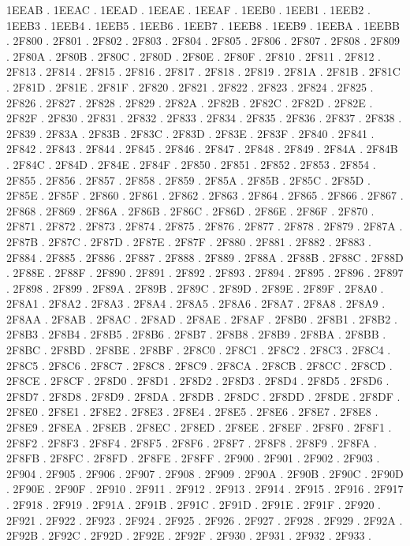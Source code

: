 1EEAB .
1EEAC .
1EEAD .
1EEAE .
1EEAF .
1EEB0 .
1EEB1 .
1EEB2 .
1EEB3 .
1EEB4 .
1EEB5 .
1EEB6 .
1EEB7 .
1EEB8 .
1EEB9 .
1EEBA .
1EEBB .
2F800 .
2F801 .
2F802 .
2F803 .
2F804 .
2F805 .
2F806 .
2F807 .
2F808 .
2F809 .
2F80A .
2F80B .
2F80C .
2F80D .
2F80E .
2F80F .
2F810 .
2F811 .
2F812 .
2F813 .
2F814 .
2F815 .
2F816 .
2F817 .
2F818 .
2F819 .
2F81A .
2F81B .
2F81C .
2F81D .
2F81E .
2F81F .
2F820 .
2F821 .
2F822 .
2F823 .
2F824 .
2F825 .
2F826 .
2F827 .
2F828 .
2F829 .
2F82A .
2F82B .
2F82C .
2F82D .
2F82E .
2F82F .
2F830 .
2F831 .
2F832 .
2F833 .
2F834 .
2F835 .
2F836 .
2F837 .
2F838 .
2F839 .
2F83A .
2F83B .
2F83C .
2F83D .
2F83E .
2F83F .
2F840 .
2F841 .
2F842 .
2F843 .
2F844 .
2F845 .
2F846 .
2F847 .
2F848 .
2F849 .
2F84A .
2F84B .
2F84C .
2F84D .
2F84E .
2F84F .
2F850 .
2F851 .
2F852 .
2F853 .
2F854 .
2F855 .
2F856 .
2F857 .
2F858 .
2F859 .
2F85A .
2F85B .
2F85C .
2F85D .
2F85E .
2F85F .
2F860 .
2F861 .
2F862 .
2F863 .
2F864 .
2F865 .
2F866 .
2F867 .
2F868 .
2F869 .
2F86A .
2F86B .
2F86C .
2F86D .
2F86E .
2F86F .
2F870 .
2F871 .
2F872 .
2F873 .
2F874 .
2F875 .
2F876 .
2F877 .
2F878 .
2F879 .
2F87A .
2F87B .
2F87C .
2F87D .
2F87E .
2F87F .
2F880 .
2F881 .
2F882 .
2F883 .
2F884 .
2F885 .
2F886 .
2F887 .
2F888 .
2F889 .
2F88A .
2F88B .
2F88C .
2F88D .
2F88E .
2F88F .
2F890 .
2F891 .
2F892 .
2F893 .
2F894 .
2F895 .
2F896 .
2F897 .
2F898 .
2F899 .
2F89A .
2F89B .
2F89C .
2F89D .
2F89E .
2F89F .
2F8A0 .
2F8A1 .
2F8A2 .
2F8A3 .
2F8A4 .
2F8A5 .
2F8A6 .
2F8A7 .
2F8A8 .
2F8A9 .
2F8AA .
2F8AB .
2F8AC .
2F8AD .
2F8AE .
2F8AF .
2F8B0 .
2F8B1 .
2F8B2 .
2F8B3 .
2F8B4 .
2F8B5 .
2F8B6 .
2F8B7 .
2F8B8 .
2F8B9 .
2F8BA .
2F8BB .
2F8BC .
2F8BD .
2F8BE .
2F8BF .
2F8C0 .
2F8C1 .
2F8C2 .
2F8C3 .
2F8C4 .
2F8C5 .
2F8C6 .
2F8C7 .
2F8C8 .
2F8C9 .
2F8CA .
2F8CB .
2F8CC .
2F8CD .
2F8CE .
2F8CF .
2F8D0 .
2F8D1 .
2F8D2 .
2F8D3 .
2F8D4 .
2F8D5 .
2F8D6 .
2F8D7 .
2F8D8 .
2F8D9 .
2F8DA .
2F8DB .
2F8DC .
2F8DD .
2F8DE .
2F8DF .
2F8E0 .
2F8E1 .
2F8E2 .
2F8E3 .
2F8E4 .
2F8E5 .
2F8E6 .
2F8E7 .
2F8E8 .
2F8E9 .
2F8EA .
2F8EB .
2F8EC .
2F8ED .
2F8EE .
2F8EF .
2F8F0 .
2F8F1 .
2F8F2 .
2F8F3 .
2F8F4 .
2F8F5 .
2F8F6 .
2F8F7 .
2F8F8 .
2F8F9 .
2F8FA .
2F8FB .
2F8FC .
2F8FD .
2F8FE .
2F8FF .
2F900 .
2F901 .
2F902 .
2F903 .
2F904 .
2F905 .
2F906 .
2F907 .
2F908 .
2F909 .
2F90A .
2F90B .
2F90C .
2F90D .
2F90E .
2F90F .
2F910 .
2F911 .
2F912 .
2F913 .
2F914 .
2F915 .
2F916 .
2F917 .
2F918 .
2F919 .
2F91A .
2F91B .
2F91C .
2F91D .
2F91E .
2F91F .
2F920 .
2F921 .
2F922 .
2F923 .
2F924 .
2F925 .
2F926 .
2F927 .
2F928 .
2F929 .
2F92A .
2F92B .
2F92C .
2F92D .
2F92E .
2F92F .
2F930 .
2F931 .
2F932 .
2F933 .
